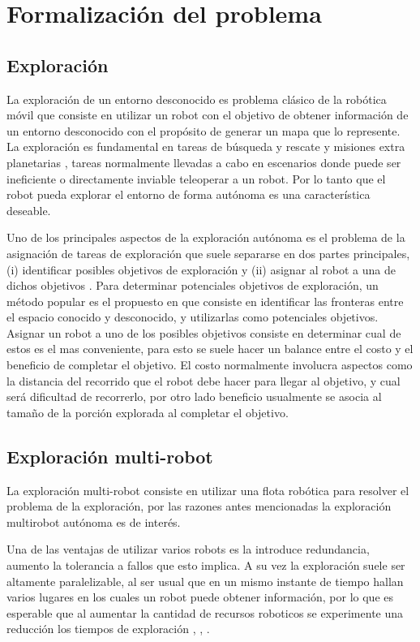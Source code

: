 \section{Formalización del problema}


\subsection{Exploración}
La exploración de un entorno desconocido es problema clásico de la robótica móvil que consiste en utilizar un robot con el objetivo de obtener información de un entorno desconocido con el propósito de generar un mapa que lo represente. La exploración es fundamental en tareas de búsqueda y rescate \cite{Liu2015} y misiones extra planetarias \cite{schuster2019towards}, tareas normalmente llevadas a cabo en escenarios donde puede ser ineficiente o directamente inviable teleoperar a un robot. Por lo tanto que el robot pueda explorar el entorno de forma autónoma es una característica deseable.

Uno de los principales aspectos de la exploración autónoma es el problema de la asignación de tareas de exploración que suele separarse en dos partes principales, (i) identificar posibles objetivos de exploración y (ii) asignar al robot a una de dichos objetivos \cite{amorin2019novel}. Para determinar potenciales objetivos de exploración, un método popular es el propuesto en \cite{yamauchi1998frontier} que consiste en identificar las fronteras entre el espacio conocido y desconocido, y utilizarlas como potenciales objetivos. Asignar un robot a uno de los posibles objetivos consiste en determinar cual de estos es el mas conveniente, para esto se suele hacer un balance entre el costo y el beneficio de completar el objetivo. El costo normalmente involucra aspectos como la distancia del recorrido que el robot debe hacer para llegar al objetivo, y cual será dificultad de recorrerlo, por otro lado beneficio usualmente se asocia al tamaño de la porción explorada al completar el objetivo. 

\subsection{Exploración multi-robot}\label{subsec:expmutirob}
La exploración multi-robot consiste en utilizar una flota robótica para resolver el problema de la exploración, por las razones antes mencionadas la exploración multirobot autónoma es de interés.  

Una de las ventajas de utilizar varios robots es la introduce redundancia, aumento la tolerancia a fallos que esto implica. A su vez la exploración suele ser altamente paralelizable, al ser usual que en un mismo instante de tiempo hallan varios lugares en los cuales un robot puede obtener información, por lo que es esperable que al aumentar la cantidad de recursos roboticos se experimente una reducción los tiempos de exploración \cite{cao1997cooperative}, \cite{dudek1996taxonomy}, \cite{guzzoni1997many}. 

